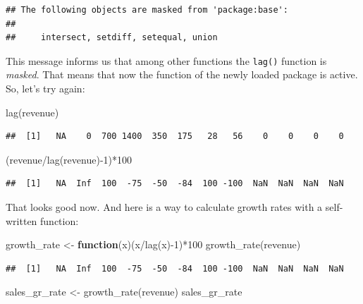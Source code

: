 \documentclass[
  12pt,
  oneside]{book}
\newenvironment{Shaded}{\begin{snugshade}}{\end{snugshade}}
\newcommand{\ControlFlowTok}[1]{\textcolor[rgb]{0.13,0.29,0.53}{\textbf{#1}}}
\newcommand{\DecValTok}[1]{\textcolor[rgb]{0.00,0.00,0.81}{#1}}
\newcommand{\FunctionTok}[1]{\textcolor[rgb]{0.00,0.00,0.00}{#1}}
\newcommand{\NormalTok}[1]{#1}
\newcommand{\OtherTok}[1]{\textcolor[rgb]{0.56,0.35,0.01}{#1}}
\newcommand{\SpecialCharTok}[1]{\textcolor[rgb]{0.00,0.00,0.00}{#1}}
\theoremstyle{definition}
\theoremstyle{definition}
\theoremstyle{definition}
\theoremstyle{definition}
\theoremstyle{remark}
\begin{document}
\begin{verbatim}
## The following objects are masked from 'package:base':
## 
##     intersect, setdiff, setequal, union
\end{verbatim}

This message informs us that among other functions the \texttt{lag()} function is \emph{masked}. That means that now the function of the newly loaded package is active. So, let's try again:

\begin{Shaded}
\begin{Highlighting}[]
\FunctionTok{lag}\NormalTok{(revenue)}
\end{Highlighting}
\end{Shaded}

\begin{verbatim}
##  [1]   NA    0  700 1400  350  175   28   56    0    0    0    0
\end{verbatim}

\begin{Shaded}
\begin{Highlighting}[]
\NormalTok{(revenue}\SpecialCharTok{/}\FunctionTok{lag}\NormalTok{(revenue)}\SpecialCharTok{{-}}\DecValTok{1}\NormalTok{)}\SpecialCharTok{*}\DecValTok{100} 
\end{Highlighting}
\end{Shaded}

\begin{verbatim}
##  [1]   NA  Inf  100  -75  -50  -84  100 -100  NaN  NaN  NaN  NaN
\end{verbatim}

That looks good now. And here is a way to calculate growth rates with a self-written function:

\begin{Shaded}
\begin{Highlighting}[]
\NormalTok{growth\_rate }\OtherTok{\textless{}{-}} \ControlFlowTok{function}\NormalTok{(x)(x}\SpecialCharTok{/}\FunctionTok{lag}\NormalTok{(x)}\SpecialCharTok{{-}}\DecValTok{1}\NormalTok{)}\SpecialCharTok{*}\DecValTok{100} 
\FunctionTok{growth\_rate}\NormalTok{(revenue)}
\end{Highlighting}
\end{Shaded}

\begin{verbatim}
##  [1]   NA  Inf  100  -75  -50  -84  100 -100  NaN  NaN  NaN  NaN
\end{verbatim}

\begin{Shaded}
\begin{Highlighting}[]
\NormalTok{sales\_gr\_rate }\OtherTok{\textless{}{-}} \FunctionTok{growth\_rate}\NormalTok{(revenue)}
\NormalTok{sales\_gr\_rate}
\end{Highlighting}
\end{Shaded}
\end{document}
